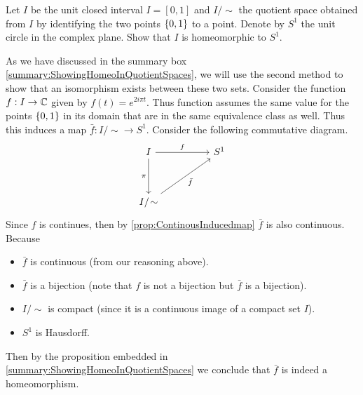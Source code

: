 \begin{problem}
	\label{prob:IntervalHomo2CircleSim}
	Let $ I $ be the unit closed interval $ I = [0,1] $ and $ I/\sim $ the quotient space obtained from $ I $ by identifying the two points $ \{0,1\} $ to a point. Denote by $ S^1 $ the unit circle in the complex plane. Show that $ I $ is homeomorphic to $ S^1 $.
\end{problem}
\begin{solution}
	As we have discussed in the summary box \autoref{summary:ShowingHomeoInQuotientSpaces}, we will use the second method to show that an isomorphism exists between these two sets. Consider the function $ f: I \to \mathbb{C} $ given by $ f(t) = e^{2i\pi t} $. Thus function assumes the same value for the points $ \{0,1\} $ in its domain that are in the same equivalence class as well. Thus this induces a map $ \bar{f}: I/\sim \to S^1 $. Consider the following commutative diagram.
	\[\begin{tikzcd}
		I && {S^1} \\
		\\
		{I/\sim}
		\arrow["f", from=1-1, to=1-3]
		\arrow["\pi"', from=1-1, to=3-1]
		\arrow["{\bar{f}}"', from=3-1, to=1-3]
	\end{tikzcd}\]
	Since $ f $ is continues, then by \autoref{prop:ContinousInducedmap} $ \bar{f} $ is also continuous. Because
	\begin{itemize}[noitemsep]
		\item $ \bar{f} $ is continuous (from our reasoning above).
		\item $ \bar{f} $ is a bijection (note that $ f $ is not a bijection but $ \bar{f} $ is a bijection).
		\item $ I/\sim $ is compact (since it is a continuous image of a compact set $ I $).
		\item $ S^1 $ is Hausdorff.
	\end{itemize} 
	Then by the proposition embedded in \autoref{summary:ShowingHomeoInQuotientSpaces} we conclude that $ \bar{f} $ is indeed a homeomorphism.
\end{solution}
